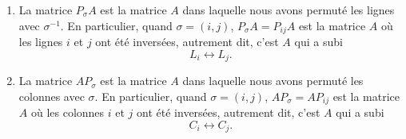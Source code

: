 \begin{lemma}
\begin{enumerate}
  \item  \label{LemyrAXQsoov}
    La matrice \( P_{\sigma}A\) est la matrice \( A\) dans laquelle nous avons permuté les lignes avec \( \sigma^{-1}\). En particulier, quand \( \sigma = (i,j) \), \( P_{\sigma}A =  P_{ij}A\) est la matrice \( A \) où les lignes \( i \) et \( j \) ont été inversées, autrement dit, c'est \( A \) qui a subi
     \begin{equation}
        L_i\leftrightarrow L_j.
    \end{equation} 
           
  \item  \label{LemyrAXQsoovi}
    La matrice \( AP_{\sigma}\) est la matrice \( A\) dans laquelle nous avons permuté les colonnes avec \( \sigma\). En particulier, quand \( \sigma = (i,j) \), \(AP_{\sigma} = AP_{ij}\) est la matrice \( A \) où les colonnes \( i \) et \( j \) ont été inversées, autrement dit, c'est \( A \) qui a subi
     \begin{equation}
        C_i\leftrightarrow C_j.
    \end{equation} 
 \end{enumerate}
\end{lemma}

